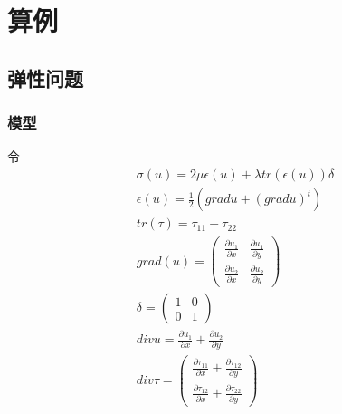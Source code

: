 \documentclass[a4paper,UTF8,titlepage]{ctexart}
\begin{document}

\section{算例}

\subsection{弹性问题}

\subsubsection{模型}

令
$$
\begin{matrix}
	\sigma(u) = 2 \mu \epsilon(u) + \lambda tr(\epsilon(u)) \delta \\
	\epsilon(u) = \frac{1}{2} (grad u + (grad u)^t) \\
	tr(\tau) = \tau_{11} + \tau_{22} \\
	grad(u) = \begin{pmatrix}
		\frac{\partial u_1}{\partial x} & \frac{\partial u_1}{\partial y} \\
		\frac{\partial u_2}{\partial x} &
		\frac{\partial u_2}{\partial y}
	\end{pmatrix} \\
	\delta = \begin{pmatrix}
		1 & 0 \\
		0 & 1
	\end{pmatrix} \\
	div u = \frac{\partial u_1}{\partial x} + \frac{\partial u_2}{\partial y} \\
	div \tau = \begin{pmatrix}
		\frac{\partial \tau_{11}}{\partial x} + \frac{\partial \tau_{12}}{\partial y} \\
		\frac{\partial \tau_{12}}{\partial x} + \frac{\partial \tau_{22}}{\partial 
		y}
	\end{pmatrix}
\end{matrix}
$$
\end{document}
